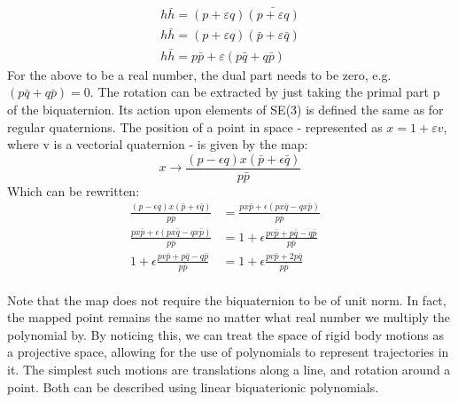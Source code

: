 \begin{equation}
    \begin{aligned}
        h\bar{h}=(p+\varepsilon q)\bar{(p+\varepsilon q)}\\
        h\bar{h}=(p+\varepsilon q)(\bar{p}+\varepsilon \bar{q})\\
        h\bar{h}=p\bar{p} + \varepsilon (p\bar{q} + q\bar{p}) 
    \end{aligned}
\end{equation}
For the above to be a real number, the dual part needs to be zero, e.g. $  (p\bar{q} + q\bar{p}) = 0$. The rotation can be extracted by just taking the primal part p of the biquaternion. Its action upon elements of SE(3) is defined the same as for regular quaternions. The position of a point in space - represented as $x = 1+\varepsilon v$, where v is a vectorial quaternion - is given by the map\cite{Siegele_2021}:
\begin{equation}
     x \rightarrow \frac{(p - \epsilon q)x(\bar{p}+\epsilon \bar{q})}{p\bar{p}}
\end{equation}
Which can be rewritten:
\begin{equation}
    \label{act}
    \begin{aligned}
        \frac{(p - \epsilon q)x(\bar{p}+\epsilon \bar{q})}{p\bar{p}}&=\frac{px\bar{p} + \epsilon(px\bar{q} - qx\bar{p})}{p\bar{p}}&\\[1.25ex]
        \frac{px\bar{p} + \epsilon(px\bar{q} - qx\bar{p})}{p\bar{p}}&= 1+\epsilon\frac{pv\bar{p} + p\bar{q} - q\bar{p}}{p\bar{p}}&\\[1.25ex]
        1+\epsilon\frac{pv\bar{p} + p\bar{q} - q\bar{p}}{p\bar{p}}&= 1 + \epsilon \frac{pv\bar{p} + 2p\bar{q}}{p\bar{p}}&\\[1.25ex]
    \end{aligned}
\end{equation}

Note that the map does not require the biquaternion to be of unit norm. In fact, the mapped point remains the same no matter what real number we multiply the polynomial by. By noticing this, we can treat the space of rigid body motions as a projective space, allowing for the use of polynomials to represent trajectories in it. The simplest such motions are translations along a line, and rotation around a point. Both can be described using linear biquaterionic polynomials.


